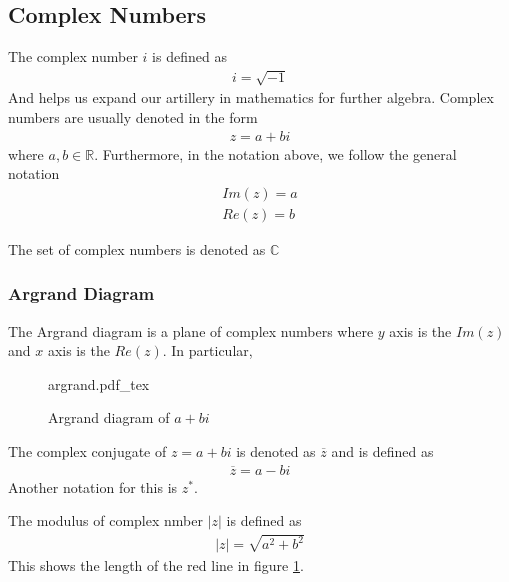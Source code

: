 \documentclass[a4paper]{article}
\newcommand{\incfig}[2][1]{%
    \def\svgwidth{#1\columnwidth}
    {#2.pdf_tex}
}
\theoremstyle{plain}
\theoremstyle{definition}
\newtheorem{defn}{Definition}[section]
\theoremstyle{remark}
\begin{document}
\subsection{Complex Numbers}
\begin{tcolorbox}[colback=black!3!white,colframe=black!60!white,title=\begin{defn}Complex Number \label{Complex Number}\end{defn}]
The complex number $i$ is defined as
\begin{align}
i = \sqrt{-1} 
\end{align}
And helps us expand our artillery in mathematics for further algebra. Complex numbers are usually denoted in the form
\begin{align*}
	z=a+bi
\end{align*}
where $a,b \in \mathbb{R}$. Furthermore, in the notation above, we follow the general notation
\begin{align*}
	Im(z) = a \\
	Re(z) = b
\end{align*}
\end{tcolorbox}
The set of complex numbers is denoted as $\mathbb{C}$
\subsubsection{Argrand Diagram}
The Argrand diagram is a plane of complex numbers where $y$ axis is the $Im(z)$ and $x$ axis is the $Re(z)$. In particular,
\begin{figure}[H]
    \centering
    \incfig{argrand}
    \caption{Argrand diagram of $a+bi$}
    \label{fig:argrand}
\end{figure}
\begin{tcolorbox}[colback=black!3!white,colframe=black!60!white,title=\begin{defn}Comlex Conjugate \label{Comlex Conjugate}\end{defn}]
The complex conjugate of $z=a+bi$ is denoted as $\overline{z}$ and is defined as
\begin{align}
\overline{z} = a-bi
\end{align}
Another notation for this is $z^{*}$.
\end{tcolorbox}
\begin{tcolorbox}[colback=black!3!white,colframe=black!60!white,title=\begin{defn}Modulus of Complex Numbers \label{Modulus of Complex Numbers}\end{defn}]
The modulus of complex nmber $|z|$ is defined as
\begin{align}
|z| = \sqrt{a^2+b^2} 
\end{align}
This shows the length of the red line in figure \ref{fig:argrand}.
\end{tcolorbox}
\end{document}
